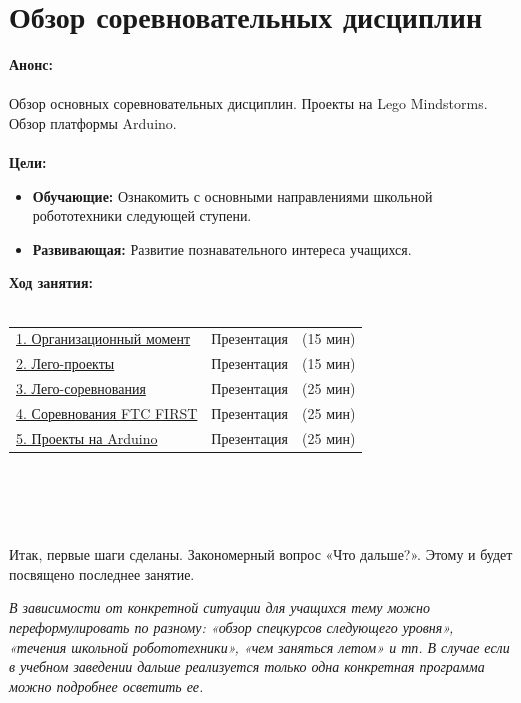 \chapter{Обзор соревновательных дисциплин}
{\bfseries Анонс:}\\\\
Обзор основных соревновательных дисциплин. Проекты на Lego Mindstorms. Обзор платформы Arduino.\\\\
{\bfseries Цели:}
\begin{itemize}
	\item{}{\bfseries Обучающие:} Ознакомить с основными направлениями школьной робототехники следующей ступени.   
	\item{}{\bfseries Развивающая:} Развитие познавательного интереса учащихся.\\
\end{itemize}	
{\bfseries Ход занятия:}\\\\
\begin{tabular}[h!]{lll}
	{\hyperlink{lesson30x1}{1. Организационный момент}}&{Презентация}&{(15 мин)}\\
	{\hyperlink{lesson30x2}{2. Лего-проекты}}&{Презентация}&{(15 мин)}\\
	{\hyperlink{lesson30x3}{3. Лего-соревнования}}&{Презентация}&{(25 мин)}\\
	{\hyperlink{lesson30x4}{4. Соревнования FTC FIRST}}&{Презентация}&{(25 мин)}\\
	{\hyperlink{lesson30x5}{5. Проекты на Arduino}}&{Презентация}&{(25 мин)}\\
\end{tabular}\\\\

{\hypertarget{lesson30x1}{}}\\\\	

Итак, первые шаги сделаны. Закономерный вопрос «Что дальше?». Этому и будет посвящено последнее занятие.

{\slshape В зависимости от конкретной ситуации для учащихся тему можно переформулировать по разному: «обзор спецкурсов следующего уровня», «течения школьной робототехники», «чем заняться летом» и тп. В случае если в учебном заведении дальше реализуется только одна конкретная программа можно подробнее осветить ее.}

